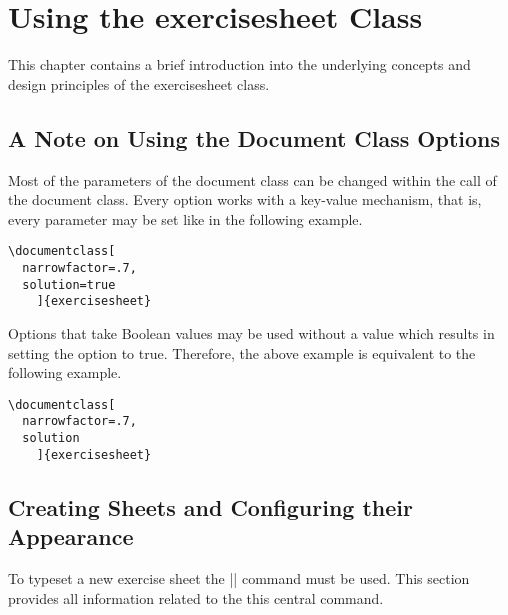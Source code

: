 \documentclass[a4paper,fleqn,9pt]{report}
\def\exercisesheet{{exercisesheet}}
\begin{document}
\chapter{Using the \exercisesheet{} Class}

This chapter contains a brief introduction into the underlying
concepts and design principles of the \exercisesheet{} class.


\section{A Note on Using the Document Class Options}

Most of the parameters of the document class can be changed within the
call of the document class. Every option works with a key-value
mechanism, that is, every parameter may be set like in the following
example.
\begin{lstlisting}
\documentclass[
  narrowfactor=.7,
  solution=true
    ]{exercisesheet}
\end{lstlisting}
Options that take Boolean values may be used without a value which
results in setting the option to true. Therefore, the above example
is equivalent to the following example.
\begin{lstlisting}
\documentclass[
  narrowfactor=.7,
  solution
    ]{exercisesheet}
\end{lstlisting}


\section{Creating Sheets and Configuring their Appearance}

To typeset a new exercise sheet the |\sheet| command must be used.
This section provides all information related to the this central
command.
\end{document}
